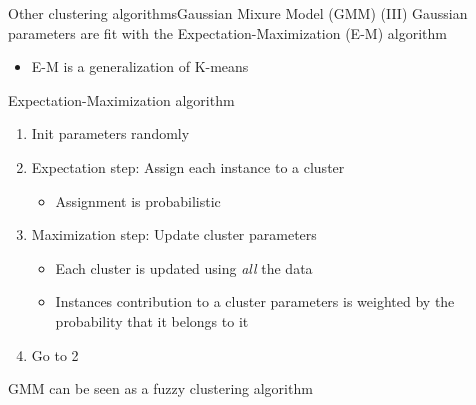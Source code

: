 \documentclass[10pt,compress]{beamer} %
\begin{document}
\begin{frame}{Other clustering algorithms}{Gaussian Mixure Model (GMM) (III)}
    Gaussian parameters are fit with the Expectation-Maximization (E-M) algorithm
       \begin{itemize}
            \item E-M is a generalization of K-means
       \end{itemize}

    \begin{block}{Expectation-Maximization algorithm}
    \begin{enumerate}
       \item Init parameters randomly
       \item Expectation step: Assign each instance to a cluster
            \begin{itemize}
            \item Assignment is probabilistic
            \end{itemize}
       \item Maximization step: Update cluster parameters
            \begin{itemize}
            \item Each cluster is updated using \textit{all} the data
            \item Instances contribution to a cluster parameters is weighted by the probability that it belongs to it
            \end{itemize}
       \item Go to 2
    \end{enumerate} 
    \end{block}

    GMM can be seen as a fuzzy clustering algorithm
\end{frame}
\end{document}
